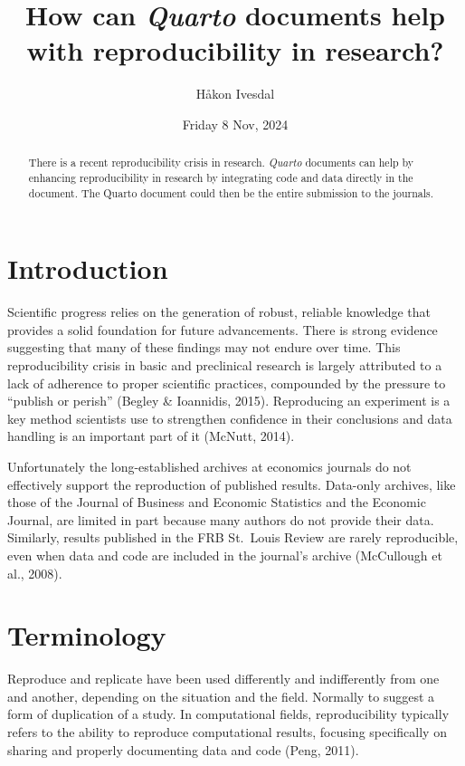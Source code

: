 \documentclass[
  a4paper,
]{article}
\title{How can \emph{Quarto} documents help with reproducibility in
research?}
\author{Håkon Ivesdal}
\date{Friday 8 Nov, 2024}
\begin{document}
\maketitle
\begin{abstract}
There is a recent reproducibility crisis in research. \emph{Quarto}
documents can help by enhancing reproducibility in research by
integrating code and data directly in the document. The Quarto document
could then be the entire submission to the journals.
\end{abstract}

\section{Introduction}\label{introduction}

Scientific progress relies on the generation of robust, reliable
knowledge that provides a solid foundation for future advancements.
There is strong evidence suggesting that many of these findings may not
endure over time. This reproducibility crisis in basic and preclinical
research is largely attributed to a lack of adherence to proper
scientific practices, compounded by the pressure to ``publish or
perish'' (Begley \& Ioannidis, 2015). Reproducing an experiment is a key
method scientists use to strengthen confidence in their conclusions and
data handling is an important part of it (McNutt, 2014).

Unfortunately the long-established archives at economics journals do not
effectively support the reproduction of published results. Data-only
archives, like those of the Journal of Business and Economic Statistics
and the Economic Journal, are limited in part because many authors do
not provide their data. Similarly, results published in the FRB
St.~Louis Review are rarely reproducible, even when data and code are
included in the journal's archive (McCullough et al., 2008).

\section{Terminology}\label{terminology}

Reproduce and replicate have been used differently and indifferently
from one and another, depending on the situation and the field. Normally
to suggest a form of duplication of a study. In computational fields,
reproducibility typically refers to the ability to reproduce
computational results, focusing specifically on sharing and properly
documenting data and code (Peng, 2011).
\end{document}
